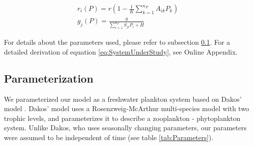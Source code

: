 \begin{eqnarray}
\label{eq:HollingGenerator}
	r_i(P) = r \left( 1 - \frac{1}{K} \sum_{k=1}^{n_P} A_{ik} P_k \right)
	\\
	g_j(P) = \frac{g}{\sum_{i=1}^{n_P} S_{ji} P_i + H}
\end{eqnarray}

For details about the parameters used, please refer to subsection \ref{subsec:Parameterization}. For a detailed derivation of equation \ref{eq:SystemUnderStudy}, see Online Appendix.

\subsection{Parameterization}
\label{subsec:Parameterization}
We parameterized our model as a freshwater plankton system based on Dakos' model \cite{Dakos2009b}. Dakos' model uses a Rosenzweig-McArthur multi-species model with two trophic levels, and parameterizes it to describe a zooplankton - phytoplankton system. Unlike Dakos, who uses seasonally changing parameters, our parameters were assumed to be independent of time (see table \ref{tab:Parameters}).

\begin{table}[H]
	\begin{center}
	\end{center}
	\caption{Values and meanings of the parameters used in our numerical experiment.}
	\label{tab:Parameters}
\end{table}


